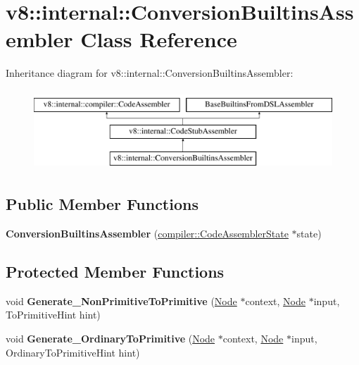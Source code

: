 \hypertarget{classv8_1_1internal_1_1ConversionBuiltinsAssembler}{}\section{v8\+:\+:internal\+:\+:Conversion\+Builtins\+Assembler Class Reference}
\label{classv8_1_1internal_1_1ConversionBuiltinsAssembler}
Inheritance diagram for v8\+:\+:internal\+:\+:Conversion\+Builtins\+Assembler\+:\begin{figure}[H]
\begin{center}
\leavevmode
\includegraphics[height=3.000000cm]{classv8_1_1internal_1_1ConversionBuiltinsAssembler}
\end{center}
\end{figure}
\subsection*{Public Member Functions}
\begin{DoxyCompactItemize}
\item 
\mbox{\label{classv8_1_1internal_1_1ConversionBuiltinsAssembler_a090de6a5d0d63597fc6b71aec639d6dd}} 
{\bfseries Conversion\+Builtins\+Assembler} (\mbox{\hyperlink{classv8_1_1internal_1_1compiler_1_1CodeAssemblerState}{compiler\+::\+Code\+Assembler\+State}} $\ast$state)
\end{DoxyCompactItemize}
\subsection*{Protected Member Functions}
\begin{DoxyCompactItemize}
\item 
\mbox{\label{classv8_1_1internal_1_1ConversionBuiltinsAssembler_af9021677e8ab1ca711a4bfdafd2f7b3a}} 
void {\bfseries Generate\+\_\+\+Non\+Primitive\+To\+Primitive} (\mbox{\hyperlink{classv8_1_1internal_1_1compiler_1_1Node}{Node}} $\ast$context, \mbox{\hyperlink{classv8_1_1internal_1_1compiler_1_1Node}{Node}} $\ast$input, To\+Primitive\+Hint hint)
\item 
\mbox{\label{classv8_1_1internal_1_1ConversionBuiltinsAssembler_a71efcb27512ef6789f1051c64006dd40}} 
void {\bfseries Generate\+\_\+\+Ordinary\+To\+Primitive} (\mbox{\hyperlink{classv8_1_1internal_1_1compiler_1_1Node}{Node}} $\ast$context, \mbox{\hyperlink{classv8_1_1internal_1_1compiler_1_1Node}{Node}} $\ast$input, Ordinary\+To\+Primitive\+Hint hint)
\end{DoxyCompactItemize}
